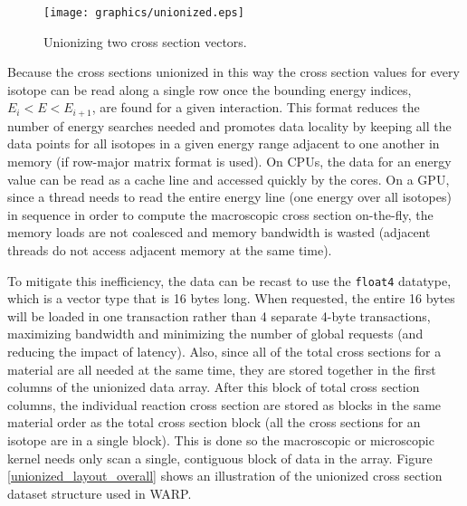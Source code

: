 \begin{figure}[h!] 
\centering
\texttt{[image: graphics/unionized.eps]}
\caption{Unionizing two cross section vectors. \label{unionized_layout} }
\end{figure}

Because the cross sections unionized in this way the cross section values for every isotope can be read along a single row once the bounding energy indices, $E_i<E<E_{i+1}$, are found for a given interaction.  This format reduces the number of energy searches needed and promotes data locality by keeping all the data points for all isotopes in a given energy range adjacent to one another in memory (if row-major matrix format is used).  On CPUs, the data for an energy value can be read as a cache line and accessed quickly by the cores.  On a GPU, since a thread needs to read the entire energy line (one energy over all isotopes) in sequence in order to compute the macroscopic cross section on-the-fly, the memory loads are not coalesced and memory bandwidth is wasted (adjacent threads do not access adjacent memory at the same time).   

To mitigate this inefficiency, the data can be recast to use the  \lstinline{float4} datatype, which is a vector type that is 16 bytes long.  When requested, the entire 16 bytes will be loaded in one transaction rather than 4 separate 4-byte transactions, maximizing bandwidth and minimizing the number of global requests (and reducing the impact of latency).  Also, since all of the total cross sections for a material are all needed at the same time, %
 they are stored together in the first columns of the unionized data array.  After this block of total cross section columns, the individual reaction cross section are stored as blocks in the same material order as the total cross section block (all the cross sections for an isotope are in a single block).  %
  This is done so the macroscopic or microscopic kernel needs only scan a single, contiguous block of data in the array.  Figure \ref{unionized_layout_overall} shows an illustration of the unionized cross section dataset structure used in WARP.
   
